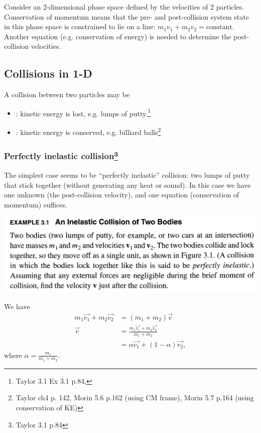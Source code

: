 Consider an 2-dimensional phase space defined by the velocities of 2 particles. Conservation of
momentum means that the pre- and post-collision system state in this phase space is constrained to
lie on a line: $m_1v_1 + m_2v_2 = \text{constant}$. Another equation (e.g. conservation of energy)
is needed to determine the post-collision velocities.

\subsection*{Collisions in 1-D}

A collision between two particles may be
\begin{itemize}
\item {}: kinetic energy is lost, e.g. lumps of putty.\footnote{Taylor 3.1 Ex 3.1 p.84, }
\item {}: kinetic energy is conserved, e.g. billiard balls\footnote{Taylor ch4 p. 142, Morin 5.6 p.162 (using CM frame), Morin 5.7 p.164 (using conservation of KE)}
\end{itemize}

\subsubsection*{Perfectly inelastic collision\footnote{Taylor 3.1 p.84}}

The simplest case seems to be ``perfectly inelastic'' collision: two lumps of putty that stick
together (without generating any heat or sound). In this case we have one unknown (the
post-collision velocity), and one equation (conservation of momentum) suffices.


\begin{mdframed}
  \includegraphics[width=400pt]{img/physics--classical-mechanics--taylor--sec-3-1.png}
\end{mdframed}

We have
\begin{align*}
  m_1\vec{v_1} + m_2\vec{v_2} &= (m_1 + m_2)\vec{v} \\
  \vec{v} &= \frac{m_1\vec{v_1} + m_2\vec{v_2}}{m_1 + m_2} \\
          &= \alpha\vec{v_1} + (1 - \alpha)\vec{v_2},
\end{align*}
where $\alpha = \frac{m_1}{m_1 + m_2}$.


